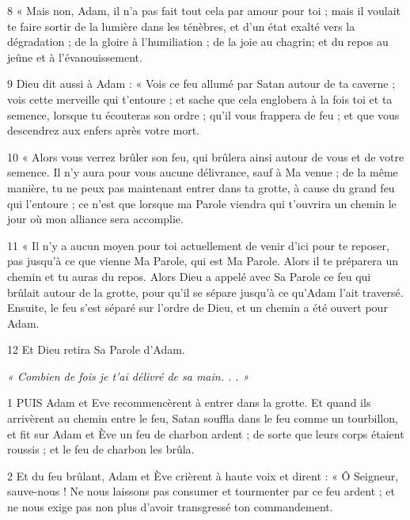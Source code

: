 \par 8 « Mais non, Adam, il n'a pas fait tout cela par amour pour toi ; mais il voulait te faire sortir de la lumière dans les ténèbres, et d'un état exalté vers la dégradation ; de la gloire à l'humiliation ; de la joie au chagrin; et du repos au jeûne et à l’évanouissement.

\par 9 Dieu dit aussi à Adam : « Vois ce feu allumé par Satan autour de ta caverne ; vois cette merveille qui t'entoure ; et sache que cela englobera à la fois toi et ta semence, lorsque tu écouteras son ordre ; qu'il vous frappera de feu ; et que vous descendrez aux enfers après votre mort.

\par 10 « Alors vous verrez brûler son feu, qui brûlera ainsi autour de vous et de votre semence. Il n'y aura pour vous aucune délivrance, sauf à Ma venue ; de la même manière, tu ne peux pas maintenant entrer dans ta grotte, à cause du grand feu qui l'entoure ; ce n’est que lorsque ma Parole viendra qui t’ouvrira un chemin le jour où mon alliance sera accomplie.

\par 11 « Il n'y a aucun moyen pour toi actuellement de venir d'ici pour te reposer, pas jusqu'à ce que vienne Ma Parole, qui est Ma Parole. Alors il te préparera un chemin et tu auras du repos. Alors Dieu a appelé avec Sa Parole ce feu qui brûlait autour de la grotte, pour qu'il se sépare jusqu'à ce qu'Adam l'ait traversé. Ensuite, le feu s'est séparé sur l'ordre de Dieu, et un chemin a été ouvert pour Adam.

\par 12 Et Dieu retira Sa Parole d'Adam.


\par \textit{« Combien de fois je t'ai délivré de sa main. . . »}

\par 1 PUIS Adam et Eve recommencèrent à entrer dans la grotte. Et quand ils arrivèrent au chemin entre le feu, Satan souffla dans le feu comme un tourbillon, et fit sur Adam et Ève un feu de charbon ardent ; de sorte que leurs corps étaient roussis ; et le feu de charbon les brûla.

\par 2 Et du feu brûlant, Adam et Ève crièrent à haute voix et dirent : « Ô Seigneur, sauve-nous ! Ne nous laissons pas consumer et tourmenter par ce feu ardent ; et ne nous exige pas non plus d’avoir transgressé ton commandement.

